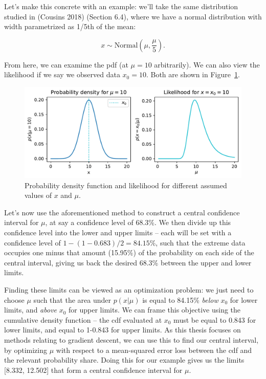 \documentclass[
  11pt,
  numbers=noendperiod]{book}
\begin{document}
Let's make this concrete with an example: we'll take the same
distribution studied in (Cousins 2018) (Section 6.4), where we have a
normal distribution with width parametrized as 1/5th of the mean:

\[x \sim \mathrm{Normal}(\mu, \frac{\mu}{5}).\]

From here, we can examime the pdf (at \(\mu=10\) arbitrarily). We can
also view the likelihood if we say we observed data \(x_0=10\). Both are
shown in Figure~\ref{fig-density}.

\begin{figure}

{\centering \includegraphics{./stat-fundamentals_files/figure-pdf/fig-density-output-1.pdf}

}

\caption{\label{fig-density}Probability density function and likelihood
for different assumed values of \(x\) and \(\mu\).}

\end{figure}

Let's now use the aforementioned method to construct a central
confidence interval for \(\mu\), at say a confidence level of 68.3\%. We
then divide up this confidence level into the lower and upper limits --
each will be set with a confidence level of \(1-(1-0.683)/2 = 84.15\%\),
such that the extreme data occupies one minus that amount (15.95\%) of
the probability on each side of the central interval, giving us back the
desired 68.3\% between the upper and lower limits.

Finding these limits can be viewed as an optimization problem: we just
need to choose \(\mu\) such that the area under \(p(x|\mu)\) is equal to
84.15\% \emph{below} \(x_0\) for lower limits, and \emph{above} \(x_0\)
for upper limits. We can frame this objective using the cumulative
density function -- the cdf evaluated at \(x_0\) must be equal to 0.843
for lower limits, and equal to 1-0.843 for upper limits. As this thesis
focuses on methods relating to gradient descent, we can use this to find
our central interval, by optimizing \(\mu\) with respect to a
mean-squared error loss between the cdf and the relevant probability
share. Doing this for our example gives us the limits {[}8.332,
12.502{]} that form a central confidence interval for \(\mu\).
\end{document}
